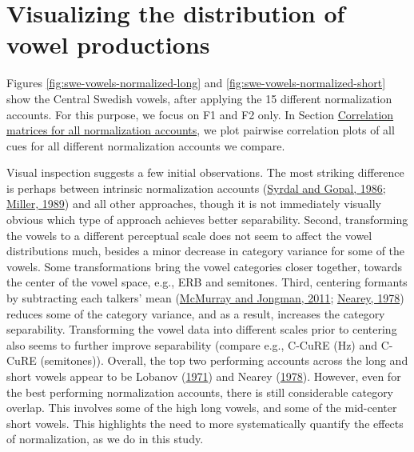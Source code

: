 \documentclass[utf8]{frontiers_suppmat} %
\begin{document}
\hypertarget{sec:normVowelSpace}{%
\section{Visualizing the distribution of vowel productions}\label{sec:normVowelSpace}}

Figures \ref{fig:swe-vowels-normalized-long} and \ref{fig:swe-vowels-normalized-short} show the Central Swedish vowels, after applying the 15 different normalization accounts. For this purpose, we focus on F1 and F2 only. In Section \protect\hyperlink{sec:correlation-matrices}{Correlation matrices for all normalization accounts}, we plot pairwise correlation plots of all cues for all different normalization accounts we compare.

Visual inspection suggests a few initial observations. The most striking difference is perhaps between intrinsic normalization accounts (\protect\hyperlink{ref-Syrdal1986}{Syrdal and Gopal, 1986}; \protect\hyperlink{ref-miller1989c}{Miller, 1989}) and all other approaches, though it is not immediately visually obvious which type of approach achieves better separability. Second, transforming the vowels to a different perceptual scale does not seem to affect the vowel distributions much, besides a minor decrease in category variance for some of the vowels. Some transformations bring the vowel categories closer together, towards the center of the vowel space, e.g., ERB and semitones. Third, centering formants by subtracting each talkers' mean (\protect\hyperlink{ref-mcmurray-jongman2011}{McMurray and Jongman, 2011}; \protect\hyperlink{ref-nearey1978}{Nearey, 1978}) reduces some of the category variance, and as a result, increases the category separability. Transforming the vowel data into different scales prior to centering also seems to further improve separability (compare e.g., C-CuRE (Hz) and C-CuRE (semitones)). Overall, the top two performing accounts across the long and short vowels appear to be Lobanov (\protect\hyperlink{ref-lobanov1971}{1971}) and Nearey (\protect\hyperlink{ref-nearey1978}{1978}). However, even for the best performing normalization accounts, there is still considerable category overlap. This involves some of the high long vowels, and some of the mid-center short vowels. This highlights the need to more systematically quantify the effects of normalization, as we do in this study.
\end{document}
